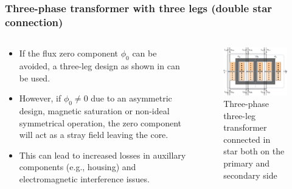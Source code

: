 \begin{frame}
	\frametitle{Three-phase transformer with three legs (double star connection)}
	\begin{columns}
		\begin{column}{0.4\textwidth}
           \begin{itemize}
				\item If the flux zero component $\phi_0$ can be avoided, a three-leg design as shown in  can be used. \pause
				\item However, if $\phi_0 \neq 0$ due to an asymmetric design, magnetic saturation or non-ideal symmetrical operation, the zero component will act as a stray field leaving the core. \pause
				\item This can lead to increased losses in auxillary components (e.g., housing) and electromagnetic interference issues.
			\end{itemize}
		\end{column}
        \hfill
		\begin{column}{0.6\textwidth}
			\onslide<1->
			\begin{figure}
				\includegraphics[height=0.7\textheight]{fig/lec04/Three_phase_transformer_3_legs_star.pdf}
				\caption{Three-phase three-leg transformer connected in star both on the primary and secondary side}
				\label{fig:Three_phase_transformer_3_legs_star}
			\end{figure}
		\end{column}
	\end{columns}
\end{frame}

